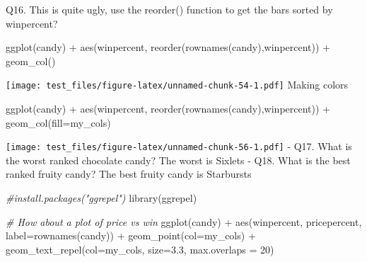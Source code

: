 \documentclass[
]{article}
\newenvironment{Shaded}{\begin{snugshade}}{\end{snugshade}}
\newcommand{\AttributeTok}[1]{\textcolor[rgb]{0.77,0.63,0.00}{#1}}
\newcommand{\CommentTok}[1]{\textcolor[rgb]{0.56,0.35,0.01}{\textit{#1}}}
\newcommand{\DecValTok}[1]{\textcolor[rgb]{0.00,0.00,0.81}{#1}}
\newcommand{\FloatTok}[1]{\textcolor[rgb]{0.00,0.00,0.81}{#1}}
\newcommand{\FunctionTok}[1]{\textcolor[rgb]{0.00,0.00,0.00}{#1}}
\newcommand{\NormalTok}[1]{#1}
\newcommand{\OtherTok}[1]{\textcolor[rgb]{0.56,0.35,0.01}{#1}}
\newcommand{\SpecialCharTok}[1]{\textcolor[rgb]{0.00,0.00,0.00}{#1}}
\newcommand{\StringTok}[1]{\textcolor[rgb]{0.31,0.60,0.02}{#1}}
\begin{document}
Q16. This is quite ugly, use the reorder() function to get the bars
sorted by winpercent?

\begin{Shaded}
\begin{Highlighting}[]
\FunctionTok{ggplot}\NormalTok{(candy) }\SpecialCharTok{+} 
\FunctionTok{aes}\NormalTok{(winpercent, }\FunctionTok{reorder}\NormalTok{(}\FunctionTok{rownames}\NormalTok{(candy),winpercent)) }\SpecialCharTok{+}
  \FunctionTok{geom\_col}\NormalTok{()}
\end{Highlighting}
\end{Shaded}

\texttt{[image: test\_files/figure-latex/unnamed-chunk-54-1.pdf]} Making
colors

\begin{Shaded}
\end{Shaded}

\begin{Shaded}
\begin{Highlighting}[]
\FunctionTok{ggplot}\NormalTok{(candy) }\SpecialCharTok{+} 
\FunctionTok{aes}\NormalTok{(winpercent, }\FunctionTok{reorder}\NormalTok{(}\FunctionTok{rownames}\NormalTok{(candy),winpercent)) }\SpecialCharTok{+}
  \FunctionTok{geom\_col}\NormalTok{(}\AttributeTok{fill=}\NormalTok{my\_cols)}
\end{Highlighting}
\end{Shaded}

\texttt{[image: test\_files/figure-latex/unnamed-chunk-56-1.pdf]} - Q17.
What is the worst ranked chocolate candy? The worst is Sixlets - Q18.
What is the best ranked fruity candy? The best fruity candy is
Starbursts

\begin{Shaded}
\begin{Highlighting}[]
\CommentTok{\#install.packages("ggrepel")}
\FunctionTok{library}\NormalTok{(ggrepel)}

\CommentTok{\# How about a plot of price vs win}
\FunctionTok{ggplot}\NormalTok{(candy) }\SpecialCharTok{+}
  \FunctionTok{aes}\NormalTok{(winpercent, pricepercent, }\AttributeTok{label=}\FunctionTok{rownames}\NormalTok{(candy)) }\SpecialCharTok{+}
  \FunctionTok{geom\_point}\NormalTok{(}\AttributeTok{col=}\NormalTok{my\_cols) }\SpecialCharTok{+} 
  \FunctionTok{geom\_text\_repel}\NormalTok{(}\AttributeTok{col=}\NormalTok{my\_cols, }\AttributeTok{size=}\FloatTok{3.3}\NormalTok{, }\AttributeTok{max.overlaps =} \DecValTok{20}\NormalTok{)}
\end{Highlighting}
\end{Shaded}
\end{document}
